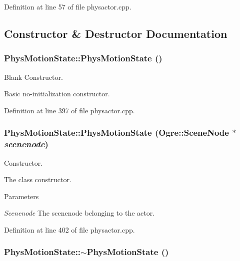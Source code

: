 Definition at line 57 of file physactor.cpp.



\subsection{Constructor \& Destructor Documentation}
\hypertarget{classPhysMotionState_a8439c3835b9d96b0b1b285126df41a42}{
\subsubsection[{PhysMotionState}]{\setlength{\rightskip}{0pt plus 5cm}PhysMotionState::PhysMotionState ()}}
\label{d2/d14/classPhysMotionState_a8439c3835b9d96b0b1b285126df41a42}


Blank Constructor. 

Basic no-\/initialization constructor. 

Definition at line 397 of file physactor.cpp.

\hypertarget{classPhysMotionState_a9c315b85bc405a36a6bd9d9a9f68c34a}{
\subsubsection[{PhysMotionState}]{\setlength{\rightskip}{0pt plus 5cm}PhysMotionState::PhysMotionState (Ogre::SceneNode $\ast$ {\em scenenode})}}
\label{d2/d14/classPhysMotionState_a9c315b85bc405a36a6bd9d9a9f68c34a}


Constructor. 

The class constructor. 
\begin{DoxyParams}{Parameters}
\item[{\em Scenenode}]The scenenode belonging to the actor. \end{DoxyParams}


Definition at line 402 of file physactor.cpp.

\hypertarget{classPhysMotionState_a74441aa0ba9a1b99ee1662b2eee9db3c}{
\subsubsection[{$\sim$PhysMotionState}]{\setlength{\rightskip}{0pt plus 5cm}PhysMotionState::$\sim$PhysMotionState ()}}
\label{d2/d14/classPhysMotionState_a74441aa0ba9a1b99ee1662b2eee9db3c}


